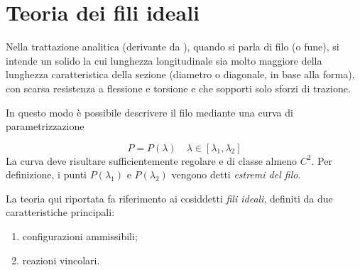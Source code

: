 \cleardoublepage
\chapter{Teoria dei fili ideali}\label{chapter:teoria_fili}
Nella trattazione analitica (derivante da \cite{siboni:funi}), quando si parla di filo (o fune), si intende un solido la cui lunghezza longitudinale sia molto maggiore della lunghezza caratteristica della sezione (diametro o diagonale, in base alla forma), con scarsa resistenza a flessione e torsione e che sopporti solo sforzi di trazione.

In questo modo è possibile descrivere il filo mediante una curva di parametrizzazione

\begin{equation*}
	P=P(\lambda) \quad \lambda\in[\lambda_1, \lambda_2]
\end{equation*}
La curva deve risultare sufficientemente regolare e di classe almeno $C^2$.
Per definizione, i punti $P(\lambda_1)$ e $P(\lambda_2)$ vengono detti \emph{estremi del filo}.

La teoria qui riportata fa riferimento ai cosiddetti \emph{fili ideali}, definiti da due caratteristiche principali:
\begin{enumerate}
	\item configurazioni ammissibili;
	\item reazioni vincolari.
\end{enumerate}

